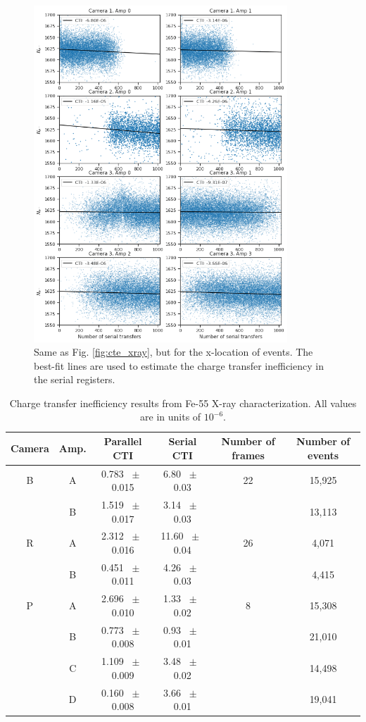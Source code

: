 \begin{figure}[htbp]
    \centering
    \includegraphics[width=0.85\textwidth]{figures/cte/xray_cte_serial.png}
    \caption{Same as Fig. \ref{fig:cte_xray}, but for the x-location of events. The best-fit lines are used to estimate the charge transfer inefficiency in the serial registers.}
    \label{fig:cte_xray_serial}
\end{figure}

\begin{table}[htbp]
    \centering
    \begin{tabular}{cccccc}\toprule
        Camera & Amp. & Parallel CTI & Serial CTI & Number of frames & Number of events \\\midrule
        B & A &0.783 $\;\pm\;$ 0.015 & 6.80 $\;\pm\;$ 0.03 & 22 & 15,925 \\
          & B &1.519 $\;\pm\;$ 0.017 & 3.14 $\;\pm\;$ 0.03 &    & 13,113 \\\midrule
        R & A &2.312 $\;\pm\;$ 0.016 & 11.60 $\;\pm\;$ 0.04 & 26 & 4,071 \\
          & B &0.451 $\;\pm\;$ 0.011 & 4.26 $\;\pm\;$ 0.03 &    & 4,415 \\\midrule
        P & A &2.696 $\;\pm\;$ 0.010 & 1.33 $\;\pm\;$ 0.02 & 8 & 15,308 \\
          & B &0.773 $\;\pm\;$ 0.008 & 0.93 $\;\pm\;$ 0.01 &   & 21,010 \\
          & C &1.109 $\;\pm\;$ 0.009 & 3.48 $\;\pm\;$ 0.02 &   & 14,498 \\
          & D &0.160 $\;\pm\;$ 0.008 & 3.66 $\;\pm\;$ 0.01 &   & 19,041 \\\midrule
    \end{tabular}
    \caption{Charge transfer inefficiency results from Fe-55 X-ray characterization. All values are in units of $10^{-6}$.}
    \label{tab:cte_xray}
\end{table}

